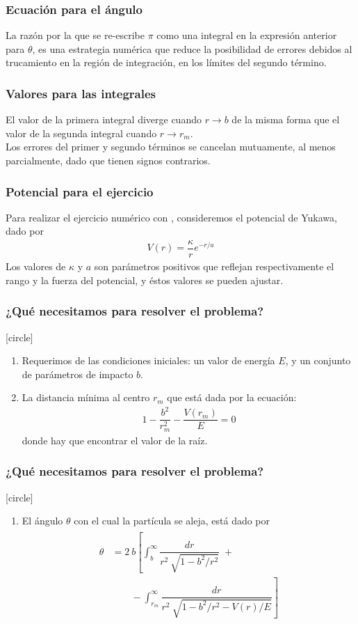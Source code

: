 \begin{frame}
\frametitle{Ecuación para el ángulo}
La razón por la que se re-escribe $\pi$ como una integral en la expresión anterior para $\theta$, es una estrategia numérica que reduce la posibilidad de errores debidos al trucamiento en la región de integración, en los límites del segundo término.
\end{frame}
\begin{frame}
\frametitle{Valores para las integrales}
El valor de la primera integral diverge cuando $r \to b$ de la misma forma que el valor de la segunda integral cuando $r \to r_{m}$.
\\
\bigskip
\pause
Los errores del primer y segundo términos se cancelan mutuamente, al menos parcialmente, dado que tienen signos contrarios.
\end{frame}
\begin{frame}
\frametitle{Potencial para el ejercicio}
Para realizar el ejercicio numérico con \python, consideremos el potencial de Yukawa, dado por
\begin{align*}
V(r) = \dfrac{\kappa}{r} e^{-r/a}
\end{align*}
Los valores de $\kappa$ y $a$ son parámetros positivos que reflejan respectivamente el rango y la fuerza del potencial, y éstos valores se pueden ajustar.
\end{frame}
\begin{frame}
\frametitle{¿Qué necesitamos para resolver el problema?}
[circle]
\begin{enumerate}[<+->]
\item Requerimos de las condiciones iniciales: un valor de energía $E$, y un conjunto de parámetros de impacto $b$.
\item La distancia mínima al centro $r_{m}$ que está dada por la ecuación:
\begin{align*}
1  - \dfrac{b^{2}}{r_{m}^{2}} - \dfrac{V(r_{m})}{E} = 0
\end{align*}
donde hay que encontrar el valor de la raíz.
\seti
\end{enumerate}
\end{frame}
\begin{frame}
\frametitle{¿Qué necesitamos para resolver el problema?}
[circle]
\begin{enumerate}
\conti
\item El ángulo $\theta$ con el cual la partícula se aleja, está dado por
\begin{align*}
\begin{aligned}
\theta &= 2 \: b \left[ \int_{b}^{\infty} \dfrac{dr}{r^{2} \: \sqrt{1 - b^{2}/r^{2}}} \; + \right. \\
& \qquad - \left. \int_{r_{m}}^{\infty} \dfrac{dr}{r^{2} \: \sqrt{1 - b^{2}/r^{2} - V(r)/E}} \right]
\end{aligned}
\end{align*}
\seti
\end{enumerate}
\end{frame}
